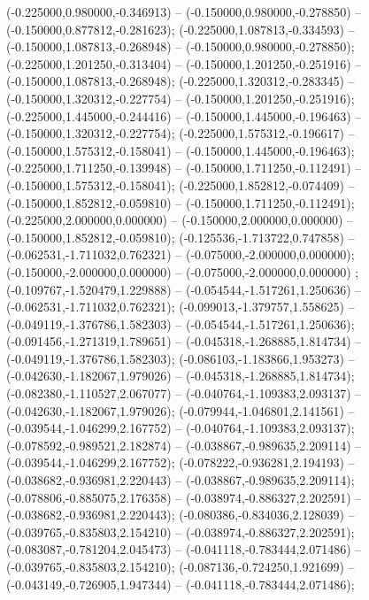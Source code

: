  (-0.225000,0.980000,-0.346913) -- (-0.150000,0.980000,-0.278850) -- (-0.150000,0.877812,-0.281623);
 (-0.225000,1.087813,-0.334593) -- (-0.150000,1.087813,-0.268948) -- (-0.150000,0.980000,-0.278850);
 (-0.225000,1.201250,-0.313404) -- (-0.150000,1.201250,-0.251916) -- (-0.150000,1.087813,-0.268948);
 (-0.225000,1.320312,-0.283345) -- (-0.150000,1.320312,-0.227754) -- (-0.150000,1.201250,-0.251916);
 (-0.225000,1.445000,-0.244416) -- (-0.150000,1.445000,-0.196463) -- (-0.150000,1.320312,-0.227754);
 (-0.225000,1.575312,-0.196617) -- (-0.150000,1.575312,-0.158041) -- (-0.150000,1.445000,-0.196463);
 (-0.225000,1.711250,-0.139948) -- (-0.150000,1.711250,-0.112491) -- (-0.150000,1.575312,-0.158041);
 (-0.225000,1.852812,-0.074409) -- (-0.150000,1.852812,-0.059810) -- (-0.150000,1.711250,-0.112491);
 (-0.225000,2.000000,0.000000) -- (-0.150000,2.000000,0.000000) -- (-0.150000,1.852812,-0.059810);
 (-0.125536,-1.713722,0.747858) -- (-0.062531,-1.711032,0.762321) -- (-0.075000,-2.000000,0.000000);
 (-0.150000,-2.000000,0.000000) -- (-0.075000,-2.000000,0.000000) ;
 (-0.109767,-1.520479,1.229888) -- (-0.054544,-1.517261,1.250636) -- (-0.062531,-1.711032,0.762321);
 (-0.099013,-1.379757,1.558625) -- (-0.049119,-1.376786,1.582303) -- (-0.054544,-1.517261,1.250636);
 (-0.091456,-1.271319,1.789651) -- (-0.045318,-1.268885,1.814734) -- (-0.049119,-1.376786,1.582303);
 (-0.086103,-1.183866,1.953273) -- (-0.042630,-1.182067,1.979026) -- (-0.045318,-1.268885,1.814734);
 (-0.082380,-1.110527,2.067077) -- (-0.040764,-1.109383,2.093137) -- (-0.042630,-1.182067,1.979026);
 (-0.079944,-1.046801,2.141561) -- (-0.039544,-1.046299,2.167752) -- (-0.040764,-1.109383,2.093137);
 (-0.078592,-0.989521,2.182874) -- (-0.038867,-0.989635,2.209114) -- (-0.039544,-1.046299,2.167752);
 (-0.078222,-0.936281,2.194193) -- (-0.038682,-0.936981,2.220443) -- (-0.038867,-0.989635,2.209114);
 (-0.078806,-0.885075,2.176358) -- (-0.038974,-0.886327,2.202591) -- (-0.038682,-0.936981,2.220443);
 (-0.080386,-0.834036,2.128039) -- (-0.039765,-0.835803,2.154210) -- (-0.038974,-0.886327,2.202591);
 (-0.083087,-0.781204,2.045473) -- (-0.041118,-0.783444,2.071486) -- (-0.039765,-0.835803,2.154210);
 (-0.087136,-0.724250,1.921699) -- (-0.043149,-0.726905,1.947344) -- (-0.041118,-0.783444,2.071486);
